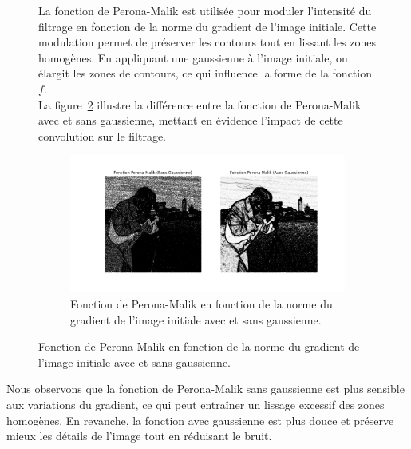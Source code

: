 \documentclass{article}
\begin{document}
\begin{figure}[H]
  \begin{minipage}{0.38\textwidth}
    La fonction de Perona-Malik est utilisée pour moduler l'intensité du filtrage en fonction de la norme du gradient de l'image initiale. Cette modulation permet de préserver les contours tout en lissant les zones homogènes. 
    En appliquant une gaussienne à l'image initiale, on élargit les zones de contours, ce qui influence la forme de la fonction \( f \). \\
    La figure~\ref{fig:perona_malik_function} illustre la différence entre la fonction de Perona-Malik avec et sans gaussienne, mettant en évidence l'impact de cette convolution sur le filtrage.
  \end{minipage}
  \hfill
  \begin{minipage}{0.58\textwidth}
    \begin{figure}[H]
      \centering
      \includegraphics[trim=100 70 100 50, clip, width=\textwidth]{img/perona_malik_function_comparison.png}
      \caption{Fonction de Perona-Malik en fonction de la norme du gradient de l'image initiale avec et sans gaussienne.}
      \label{fig:perona_malik_function}
    \end{figure}
  \end{minipage}
\end{figure}
Nous observons que la fonction de Perona-Malik sans gaussienne est plus sensible aux variations du gradient, ce qui peut entraîner un lissage excessif des zones homogènes. En revanche, la fonction avec gaussienne est plus douce et préserve mieux les détails de l'image tout en réduisant le bruit.
\end{document}
